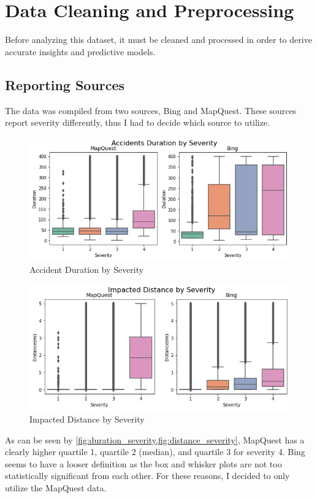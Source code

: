 \section{Data Cleaning and Preprocessing}
\noindent
Before analyzing this dataset, it must be cleaned and processed in order to derive accurate insights and predictive models.

\subsection{Reporting Sources}
\noindent
The data was compiled from two sources, Bing and MapQuest. These sources report severity differently, thus I had to decide which source to utilize. 

\begin{figure}[H]
    \centering
    \includegraphics[width=115mm,height=\textheight,keepaspectratio]{images/duration_severity.png}
    \caption{Accident Duration by Severity}
    \label{fig:duration_severity}
\end{figure}

\begin{figure}[H]
    \centering
    \includegraphics[width=115mm,height=\textheight,keepaspectratio]{images/distance_severity.png}
    \caption{Impacted Distance by Severity}
    \label{fig:distance_severity}
\end{figure}

As can be seen by \cref{fig:duration_severity,fig:distance_severity}, MapQuest has a clearly higher quartile 1, quartile 2 (median), and quartile 3 for severity 4. Bing seems to have a looser definition as the box and whisker plots are not too statistically significant from each other. For these reasons, I decided to only utilize the MapQuest data.


